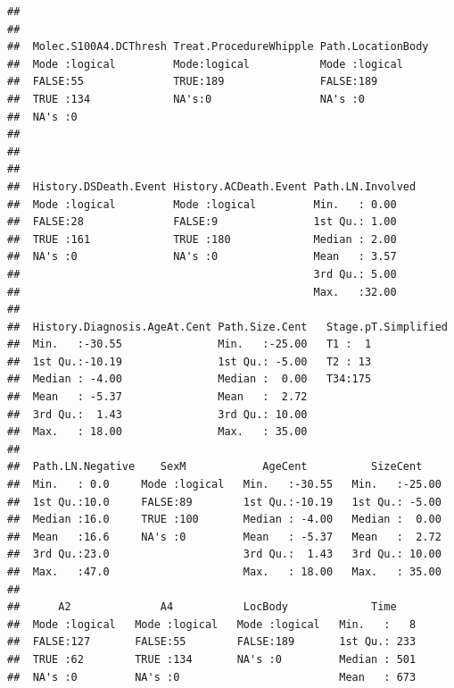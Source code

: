 \documentclass{article}\usepackage[]{graphicx}\usepackage[]{color}
\makeatletter
\newenvironment{kframe}{%
 \def\at@end@of@kframe{}%
 \ifinner\ifhmode%
  \def\at@end@of@kframe{\end{minipage}}%
  \begin{minipage}{\columnwidth}%
 \fi\fi%
 \def\FrameCommand##1{\hskip\@totalleftmargin \hskip-\fboxsep
 \colorbox{shadecolor}{##1}\hskip-\fboxsep
     \hskip-\linewidth \hskip-\@totalleftmargin \hskip\columnwidth}%
 \MakeFramed {\advance\hsize-\width
   \@totalleftmargin\z@ \linewidth\hsize
   \@setminipage}}%
 {\par\unskip\endMakeFramed%
 \at@end@of@kframe}
\newenvironment{knitrout}{}{} %
\makeatother
\begin{document}
\begin{knitrout}
\begin{kframe}
\begin{verbatim}
##                                                                    
##                                                                    
##  Molec.S100A4.DCThresh Treat.ProcedureWhipple Path.LocationBody
##  Mode :logical         Mode:logical           Mode :logical    
##  FALSE:55              TRUE:189               FALSE:189        
##  TRUE :134             NA's:0                 NA's :0          
##  NA's :0                                                       
##                                                                
##                                                                
##                                                                
##  History.DSDeath.Event History.ACDeath.Event Path.LN.Involved
##  Mode :logical         Mode :logical         Min.   : 0.00   
##  FALSE:28              FALSE:9               1st Qu.: 1.00   
##  TRUE :161             TRUE :180             Median : 2.00   
##  NA's :0               NA's :0               Mean   : 3.57   
##                                              3rd Qu.: 5.00   
##                                              Max.   :32.00   
##                                                              
##  History.Diagnosis.AgeAt.Cent Path.Size.Cent   Stage.pT.Simplified
##  Min.   :-30.55               Min.   :-25.00   T1 :  1            
##  1st Qu.:-10.19               1st Qu.: -5.00   T2 : 13            
##  Median : -4.00               Median :  0.00   T34:175            
##  Mean   : -5.37               Mean   :  2.72                      
##  3rd Qu.:  1.43               3rd Qu.: 10.00                      
##  Max.   : 18.00               Max.   : 35.00                      
##                                                                   
##  Path.LN.Negative    SexM            AgeCent          SizeCent     
##  Min.   : 0.0     Mode :logical   Min.   :-30.55   Min.   :-25.00  
##  1st Qu.:10.0     FALSE:89        1st Qu.:-10.19   1st Qu.: -5.00  
##  Median :16.0     TRUE :100       Median : -4.00   Median :  0.00  
##  Mean   :16.6     NA's :0         Mean   : -5.37   Mean   :  2.72  
##  3rd Qu.:23.0                     3rd Qu.:  1.43   3rd Qu.: 10.00  
##  Max.   :47.0                     Max.   : 18.00   Max.   : 35.00  
##                                                                    
##      A2              A4           LocBody             Time     
##  Mode :logical   Mode :logical   Mode :logical   Min.   :   8  
##  FALSE:127       FALSE:55        FALSE:189       1st Qu.: 233  
##  TRUE :62        TRUE :134       NA's :0         Median : 501  
##  NA's :0         NA's :0                         Mean   : 673  

\end{verbatim}
\end{kframe}
\end{knitrout}
\end{document}
